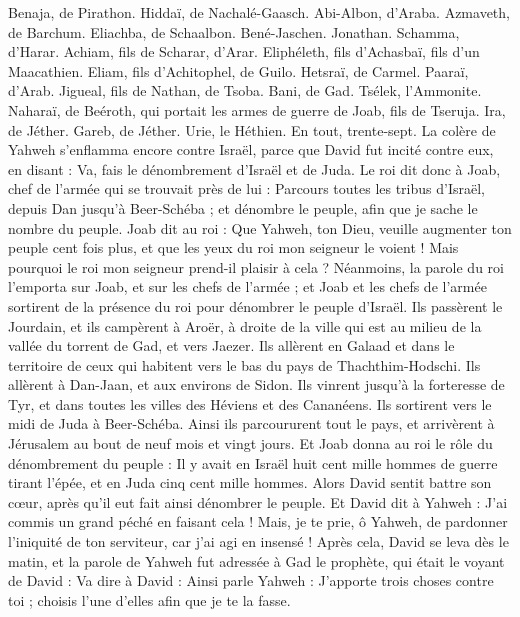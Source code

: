 \begin{multicols}{2}
Benaja, de Pirathon. Hiddaï, de Nachalé-Gaasch.
Abi-Albon, d'Araba. Azmaveth, de Barchum.
Eliachba, de Schaalbon. Bené-Jaschen. Jonathan.
Schamma, d'Harar. Achiam, fils de Scharar, d'Arar.
Eliphéleth, fils d'Achasbaï, fils d'un Maacathien. Eliam, fils d'Achitophel, de Guilo.
Hetsraï, de Carmel. Paaraï, d'Arab.
Jigueal, fils de Nathan, de Tsoba. Bani, de Gad.
Tsélek, l'Ammonite. Naharaï, de Beéroth, qui portait les armes de guerre de Joab, fils de Tseruja.
Ira, de Jéther. Gareb, de Jéther.
Urie, le Héthien. En tout, trente-sept.
\VerseOne{}La colère de Yahweh s'enflamma encore contre Israël, parce que David fut incité contre eux, en disant : Va, fais le dénombrement d'Israël et de Juda.
Le roi dit donc à Joab, chef de l'armée qui se trouvait près de lui : Parcours toutes les tribus d'Israël, depuis Dan jusqu'à Beer-Schéba ; et dénombre le peuple, afin que je sache le nombre du peuple.
Joab dit au roi : Que Yahweh, ton Dieu, veuille augmenter ton peuple cent fois plus, et que les yeux du roi mon seigneur le voient ! Mais pourquoi le roi mon seigneur prend-il plaisir à cela ?
Néanmoins, la parole du roi l'emporta sur Joab, et sur les chefs de l'armée ; et Joab et les chefs de l'armée sortirent de la présence du roi pour dénombrer le peuple d'Israël.
Ils passèrent le Jourdain, et ils campèrent à Aroër, à droite de la ville qui est au milieu de la vallée du torrent de Gad, et vers Jaezer.
Ils allèrent en Galaad et dans le territoire de ceux qui habitent vers le bas du pays de Thachthim-Hodschi. Ils allèrent à Dan-Jaan, et aux environs de Sidon.
Ils vinrent jusqu'à la forteresse de Tyr, et dans toutes les villes des Héviens et des Cananéens. Ils sortirent vers le midi de Juda à Beer-Schéba.
Ainsi ils parcoururent tout le pays, et arrivèrent à Jérusalem au bout de neuf mois et vingt jours.
Et Joab donna au roi le rôle du dénombrement du peuple : Il y avait en Israël huit cent mille hommes de guerre tirant l'épée, et en Juda cinq cent mille hommes.
Alors David sentit battre son cœur, après qu'il eut fait ainsi dénombrer le peuple. Et David dit à Yahweh : J'ai commis un grand péché en faisant cela ! Mais, je te prie, ô Yahweh, de pardonner l'iniquité de ton serviteur, car j'ai agi en insensé !
Après cela, David se leva dès le matin, et la parole de Yahweh fut adressée à Gad le prophète, qui était le voyant de David :
Va dire à David : Ainsi parle Yahweh : J'apporte trois choses contre toi ; choisis l'une d'elles afin que je te la fasse.

\end{multicols}
